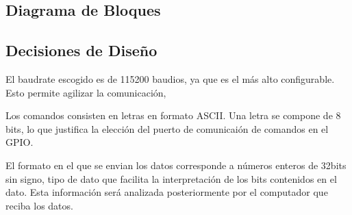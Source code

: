 \subsection{Diagrama de Bloques}



\subsection{Decisiones de Diseño}

El baudrate escogido es de 115200 baudios, ya que es el más alto configurable. Esto permite agilizar la comunicación,

Los comandos consisten en letras en formato ASCII. Una letra se compone de 8 bits, lo que justifica la elección del puerto de comunicaión de comandos en el GPIO.

El formato en el que se envian los datos corresponde a números enteros de 32bits sin signo, tipo de dato que facilita la interpretación de los bits contenidos en el dato. Esta información será analizada posteriormente por el computador que reciba los datos.

